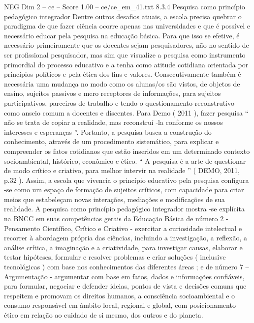 \begin{textsample}{NEG Dim 2 – ce – Score 1.00 – ce/ce\_em\_41.txt}  \label{ex:f2_neg_208}
8.3.4 Pesquisa como princípio pedagógico integrador Dentre outros desafios atuais, a escola precisa quebrar o paradigma de que fazer ciência ocorre apenas nas universidades e que é possível e necessário educar pela pesquisa na educação básica.
Para que isso se efetive, é necessário primeiramente que os docentes sejam pesquisadores, não no sentido de ser profissional pesquisador, mas sim que visualize a pesquisa como instrumento primordial do processo educativo e a tenha como atitude cotidiana orientada por princípios políticos e pela ética dos fins e valores.
Consecutivamente também é necessária uma mudança no modo como os alunas/os são vistos, de objetos de ensino, sujeitos passivos e mero receptores de informações, para sujeitos participativos, parceiros de trabalho e tendo o questionamento reconstrutivo como anseio comum a docentes e discentes.
Para Demo ( 2011 ), fazer pesquisa “ não se trata de copiar a realidade, mas reconstruí -la conforme os nossos interesses e esperanças ”.
Portanto, a pesquisa busca a construção do conhecimento, através de um procedimento sistemático, para explicar e compreender os fatos cotidianos que estão inseridos em um determinado contexto socioambiental, histórico, econômico e ético. “ A pesquisa é a arte de questionar de modo crítico e criativo, para melhor intervir na realidade ” ( DEMO, 2011, p.32 ).
Assim, a escola que vivencia o princípio educativo pela pesquisa configura -se como um espaço de formação de sujeitos críticos, com capacidade para criar meios que estabeleçam novas interações, mediações e modificações de sua realidade.
A pesquisa como princípio pedagógico integrador mostra -se explícita na BNCC em suas competências gerais da Educação Básica de número 2 - Pensamento Científico, Crítico e Criativo - exercitar a curiosidade intelectual e recorrer à abordagem própria das ciências, incluindo a investigação, a reflexão, a análise crítica, a imaginação e a criatividade, para investigar causas, elaborar e testar hipóteses, formular e resolver problemas e criar soluções ( inclusive tecnológicas ) com base nos conhecimentos das diferentes áreas ; e de número 7 – Argumentação - argumentar com base em fatos, dados e informações confiáveis, para formular, negociar e defender ideias, pontos de vista e decisões comuns que respeitem e promovam os direitos humanos, a consciência socioambiental e o consumo responsável em âmbito local, regional e global, com posicionamento ético em relação ao cuidado de si mesmo, dos outros e do planeta.

\end{textsample}
